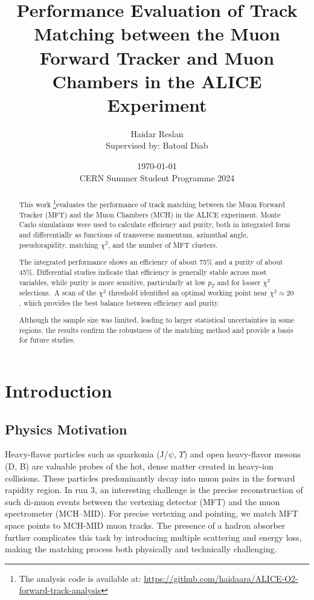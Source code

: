 \documentclass{article}
\title{Performance Evaluation of Track Matching between the Muon Forward Tracker and Muon Chambers in the ALICE Experiment}
\author{Haidar Reslan \\ \small Supervised by: Batoul Diab}
\date{  \today
        \\ \small CERN Summer Student Programme 2024}
\begin{document}
\maketitle

\begin{abstract}
This work \footnote{The analysis code is available at: \url{https://github.com/haidaara/ALICE-O2-forward-track-analysis}}evaluates the performance of track matching between the Muon Forward Tracker (MFT) and the Muon Chambers (MCH) in the ALICE experiment.
Monte Carlo simulations were used to calculate efficiency and purity, both in integrated form and differentially as functions of transverse momentum,
azimuthal angle, pseudorapidity, matching $\chi^2$, and the number of MFT clusters.

The integrated performance shows an efficiency of about 75\% and a purity of about 45\%. Differential studies indicate that efficiency
is generally stable across most variables, while purity is more sensitive, particularly at low $p_T$ and for looser $\chi^2$ selections.\
A scan of the $\chi^2$ threshold identified an optimal working point near $\chi^2 \approx 20$, which provides the best balance between 
efficiency and purity.

Although the sample size was limited, leading to larger statistical uncertainties in some regions, the results confirm the robustness 
of the matching method and provide a basis for future studies.
\end{abstract}


\section{Introduction}
\subsection{Physics Motivation}
Heavy-flavor particles such as quarkonia (J/$\psi$, $\Upsilon$) and open heavy-flavor mesons (D, B) are valuable probes of the hot, dense matter created in heavy-ion collisions.
These particles predominantly decay into muon pairs in the forward rapidity region. In run 3, an interesting challenge is the precise reconstruction of such di-muon 
events between the vertexing detector (MFT) and the muon spectrometer (MCH--MID). For precise vertexing and pointing, we match MFT space points 
to MCH-MID muon tracks.
The presence of a hadron absorber further complicates this task by introducing multiple scattering and energy loss, making the matching process both 
physically and technically challenging.
\end{document}
